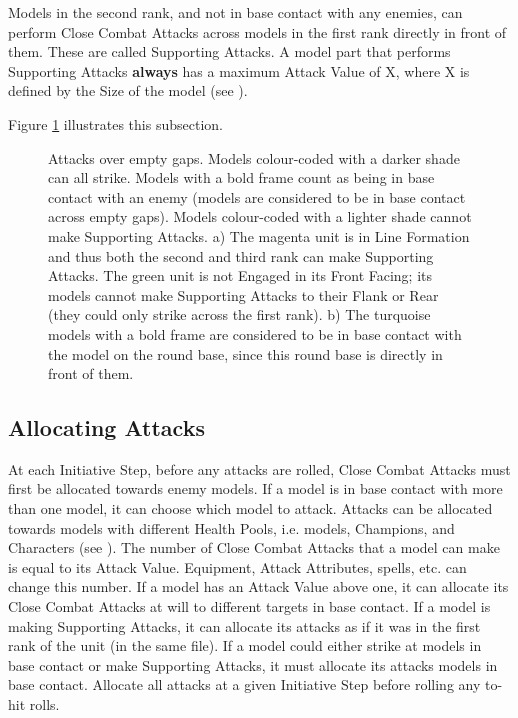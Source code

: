 Models in the second rank, and not in base contact with any enemies, can perform Close Combat Attacks across models in the first rank directly in front of them. These are called Supporting Attacks. A model part that performs Supporting Attacks \textbf{always} has a maximum Attack Value of X, where X is defined by the Size of the model (see ).

Figure \ref{figure/empty_gaps} illustrates this subsection.

\newcommand{\figEGA}{a)}
\newcommand{\figEGB}{b)}

\begin{figure}[!htbp]
\centering
\def\svgwidth{0.7\textwidth}

\caption{Attacks over empty gaps.\captionpar
Models colour-coded with a darker shade can all strike. Models with a bold frame count as being in base contact with an enemy (models are considered to be in base contact across empty gaps). Models colour-coded with a lighter shade cannot make Supporting Attacks.\captionpar
a) The magenta unit is in Line Formation and thus both the second and third rank can make Supporting Attacks. The green unit is not Engaged in its Front Facing; its models cannot make Supporting Attacks to their Flank or Rear (they could only strike across the first rank).\captionpar
b) The turquoise models with a bold frame are considered to be in base contact with the model on the round base, since this round base is directly in front of them.
}
\label{figure/empty_gaps}
\end{figure}

\subsection{Allocating Attacks}
\label{allocation_attacks}

At each Initiative Step, before any attacks are rolled, Close Combat Attacks must first be allocated towards enemy models. If a model is in base contact with more than one model, it can choose which model to attack. Attacks can be allocated towards models with different Health Pools, i.e. \rnf{} models, Champions, and Characters (see ). The number of Close Combat Attacks that a model can make is equal to its Attack Value. Equipment, Attack Attributes, spells, etc. can change this number. If a model has an Attack Value above one, it can allocate its Close Combat Attacks at will to different targets in base contact. If a model is making Supporting Attacks, it can allocate its attacks as if it was in the first rank of the unit (in the same file). If a model could either strike at models in base contact or make Supporting Attacks, it must allocate its attacks  models in base contact. Allocate all attacks at a given Initiative Step before rolling any to-hit rolls.


